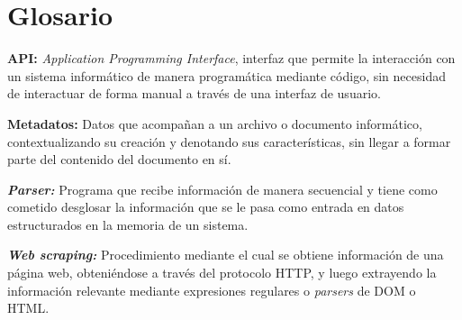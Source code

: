 
\chapter{Glosario}

\textbf{API:} \textit{Application Programming Interface}, interfaz que permite la interacción con un sistema informático de manera programática mediante código, sin necesidad de interactuar de forma manual a través de una interfaz de usuario.

\textbf{Metadatos:} Datos que acompañan a un archivo o documento informático, contextualizando su creación y denotando sus características, sin llegar a formar parte del contenido del documento en sí.

\textbf{\textit{Parser:}} Programa que recibe información de manera secuencial y tiene como cometido desglosar la información que se le pasa como entrada en datos estructurados en la memoria de un sistema.

\textbf{\textit{Web scraping:}} Procedimiento mediante el cual se obtiene información de una página web, obteniéndose a través del protocolo HTTP, y luego extrayendo la información relevante mediante expresiones regulares o \textit{parsers} de DOM o HTML.